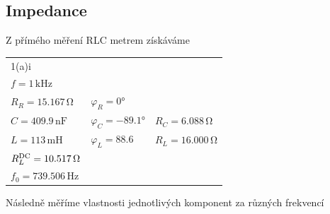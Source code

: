 \documentclass[czech,11pt,a4paper]{article}
\begin{document}
\begin{multicols}{2}
		\subsection{Impedance}
		Z přímého měření RLC metrem získáváme
			\begin{tabular}{lll}
				\hline
				\hline
				1(a)i		&& \\
				$f= 1 \,\mathrm{kHz}$		&& \\
				$R_R= 15.167 \,\mathrm{\Omega}$		&$\varphi_R= 0$°	& \\
				$C=409.9 \,\mathrm{nF}$		&$\varphi_C= -89.1$°	&$R_C=6.088 \,\mathrm{\Omega}$		\\
				$L=113 \,\mathrm{mH}$		&$\varphi_L=88.6$	&$R_L=16.000\,\mathrm{\Omega}$		\\
				\hline
				$R^{\rm DC}_L= 10.517\,\mathrm{\Omega}$& \\
				\hline
				$f_0=739.506 \,\mathrm{Hz}$		&& \\
				\hline
				\hline
			\end{tabular}
		
		
		Následně měříme vlastnosti jednotlivých komponent za různých frekvencí
\end{multicols}
\end{document}
